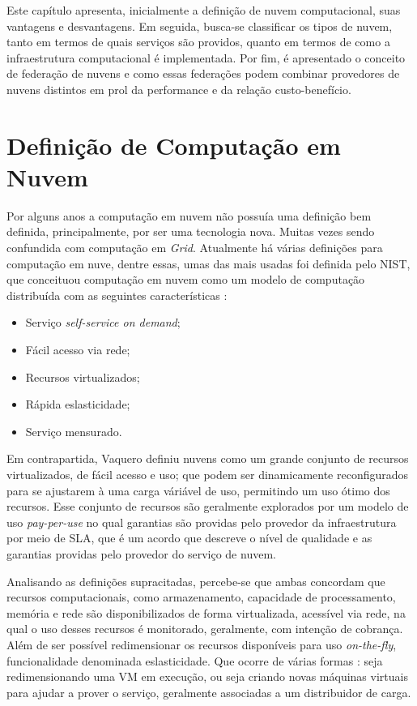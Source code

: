 Este capítulo apresenta, inicialmente a definição de nuvem computacional, suas vantagens e desvantagens. Em seguida, busca-se classificar os tipos de nuvem, tanto em termos de quais serviços são providos, quanto em termos de como a infraestrutura computacional é implementada. Por fim, é apresentado o conceito de federação de nuvens e como essas federações podem combinar provedores de nuvens distintos em prol da performance e da relação custo-benefício.

\section{Definição de Computação em Nuvem}

Por alguns anos a computação em nuvem não possuía uma definição bem definida, principalmente, por ser uma tecnologia nova. Muitas vezes sendo confundida com computação em \textit{Grid}\cite{Vaquero:2008:BCT:1496091.1496100_Cloud_definition}. Atualmente há várias definições para computação em nuve, dentre essas, umas das mais usadas foi definida pelo \acrfull{NIST}, que conceituou computação em nuvem como um modelo de computação distribuída com as seguintes características \cite{NIST_CLOUD_DEFINITION}: 
\begin{itemize}
	\item Serviço \textit{self-service on demand};
	\item Fácil acesso via rede;
	\item Recursos virtualizados;
	\item Rápida eslasticidade; 
	\item Serviço mensurado.
\end{itemize}

Em contrapartida, Vaquero\cite{Vaquero:2008:BCT:1496091.1496100_Cloud_definition} definiu nuvens como um grande conjunto de recursos virtualizados, de fácil acesso e uso; que podem ser dinamicamente reconfigurados para se ajustarem à uma carga váriável de uso, permitindo um uso ótimo dos recursos. Esse conjunto de recursos são geralmente explorados por um modelo de uso \textit{pay-per-use} no qual garantias são providas pelo provedor da infraestrutura por meio de \acrfull{SLA}, que é um acordo que descreve o nível de qualidade e as garantias providas pelo provedor do serviço de nuvem.

Analisando as definições supracitadas, percebe-se que ambas concordam que recursos computacionais, como armazenamento, capacidade de processamento, memória e rede são disponibilizados de forma virtualizada, acessível via rede, na qual o uso desses recursos é monitorado, geralmente, com intenção de cobrança. Além de ser possível redimensionar os recursos disponíveis para uso \textit{on-the-fly}, funcionalidade denominada eslasticidade. Que ocorre de várias formas \cite{Coutinho2015}: seja redimensionando uma \acrshort{VM} em execução, ou seja criando novas máquinas virtuais para ajudar a prover o serviço, geralmente associadas a um distribuidor de carga.

